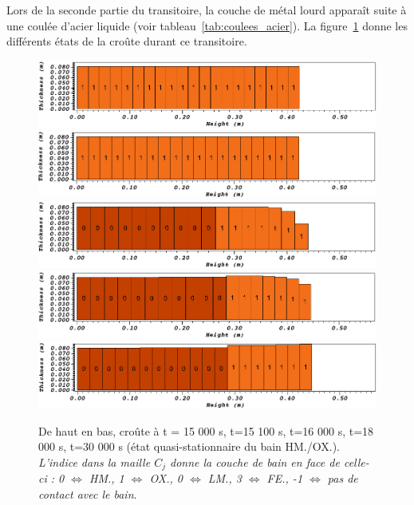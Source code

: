 Lors de la seconde partie du transitoire, la couche de métal lourd apparaît suite à une coulée d'acier liquide (voir tableau~\ref{tab:coulees_acier}). La figure~\ref{fig:croutes_2} donne les différents états de la croûte durant ce transitoire.
\begin{figure}
\centering
\includegraphics[width=\textwidth, keepaspectratio=true]{Figures/croute_15000.png}\\
\includegraphics[width=\textwidth, keepaspectratio=true]{Figures/croute_15100.png}\\
\includegraphics[width=\textwidth, keepaspectratio=true]{Figures/croute_16000.png}\\
\includegraphics[width=\textwidth, keepaspectratio=true]{Figures/croute_18000.png}\\
\includegraphics[width=\textwidth, keepaspectratio=true]{Figures/croute_30000.png}\\
\caption{De haut en bas, croûte à t = 15 000 s, t=15 100 s, t=16 000 s, t=18 000 s, t=30 000 s (état quasi-stationnaire du bain HM./OX.). \textit{L'indice dans la maille $C_j$ donne la couche de bain en face de celle-ci : 0 $\Leftrightarrow$ HM., 1 $\Leftrightarrow$ OX., 0 $\Leftrightarrow$ LM., 3 $\Leftrightarrow$ FE., -1 $\Leftrightarrow$ pas de contact avec le bain}.}
\label{fig:croutes_2}
\end{figure}
